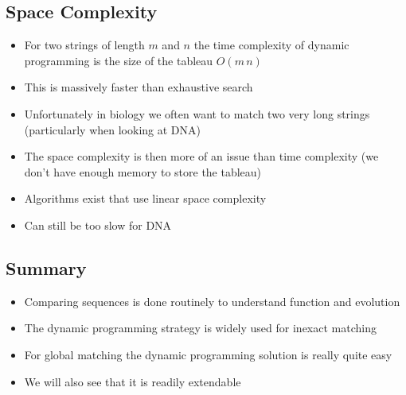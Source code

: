 \begin{slide}
\section{Space Complexity}

\begin{PauseHighLight}
  \begin{itemize}
  \item For two strings of length $m$ and $n$ the time complexity of
    dynamic programming is the size of the tableau $O(m\,n)$\pause
  \item This is massively faster than exhaustive search\pause
  \item Unfortunately in biology we often want to match two very long
    strings (particularly when looking at DNA)\pause
  \item The space complexity is then more of an issue than time
    complexity (we don't have enough memory to store the tableau)\pause
  \item Algorithms exist that use linear space complexity\pause
  \item Can still be too slow for DNA\pause
  \end{itemize}
\end{PauseHighLight}

\end{slide}



\begin{slide}
\section{Summary}

\begin{PauseHighLight}
  \begin{itemize}
  \item Comparing sequences is done routinely to understand function and
    evolution\pause
  \item The dynamic programming strategy is widely used for inexact matching\pause
  \item For global matching the dynamic programming solution is really
    quite easy\pause
  \item We will also see that it is readily extendable\pause
  \end{itemize}
\end{PauseHighLight}


\end{slide}
